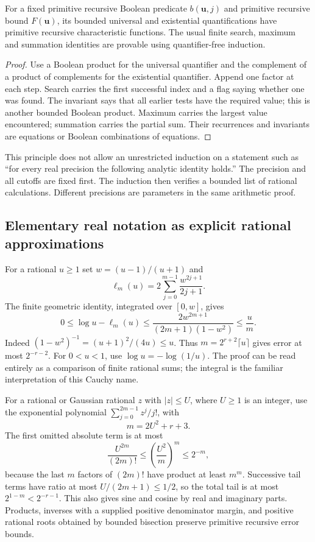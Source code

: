 \begin{lemma}
For a fixed primitive recursive Boolean predicate $b(\mathbf u,j)$ and primitive recursive bound $F(\mathbf u)$, its bounded universal and existential quantifications have primitive recursive characteristic functions. The usual finite search, maximum and summation identities are provable using quantifier-free induction.
\end{lemma}
\begin{proof}
Use a Boolean product for the universal quantifier and the complement of a product of complements for the existential quantifier. Append one factor at each step. Search carries the first successful index and a flag saying whether one was found. The invariant says that all earlier tests have the required value; this is another bounded Boolean product. Maximum carries the largest value encountered; summation carries the partial sum. Their recurrences and invariants are equations or Boolean combinations of equations.
\end{proof}

This principle does not allow an unrestricted induction on a statement such as ``for every real precision the following analytic identity holds.'' The precision and all cutoffs are fixed first. The induction then verifies a bounded list of rational calculations. Different precisions are parameters in the same arithmetic proof.

\subsection{Elementary real notation as explicit rational approximations}

For a rational $u\geq1$ set $w=(u-1)/(u+1)$ and
\begin{equation}
 \ell_m(u)=2\sum_{j=0}^{m-1}\frac{w^{2j+1}}{2j+1}.
 \label{eq:basic-log-name}
\end{equation}
The finite geometric identity, integrated over $[0,w]$, gives
\[
 0\leq\log u-\ell_m(u)
 \leq\frac{2w^{2m+1}}{(2m+1)(1-w^2)}\leq\frac{u}{m}.
\]
Indeed $(1-w^2)^{-1}=(u+1)^2/(4u)\leq u$. Thus
$m=2^{r+2}\lceil u\rceil$ gives error at most $2^{-r-2}$.
For $0<u<1$, use $\log u=-\log(1/u)$. The proof can be read entirely as a comparison of finite rational sums; the integral is the familiar interpretation of this Cauchy name.

For a rational or Gaussian rational $z$ with $|z|\leq U$, where $U\geq1$ is an integer, use the exponential polynomial $\sum_{j=0}^{2m-1}z^j/j!$, with
\[
 m=2U^2+r+3.
\]
The first omitted absolute term is at most
\[
 \frac{U^{2m}}{(2m)!}\leq\left(\frac{U^2}{m}\right)^m\leq2^{-m},
\]
because the last $m$ factors of $(2m)!$ have product at least $m^m$.
Successive tail terms have ratio at most $U/(2m+1)\leq1/2$, so the total tail is at most $2^{1-m}<2^{-r-1}$. This also gives sine and cosine by real and imaginary parts. Products, inverses with a supplied positive denominator margin, and positive rational roots obtained by bounded bisection preserve primitive recursive error bounds.


